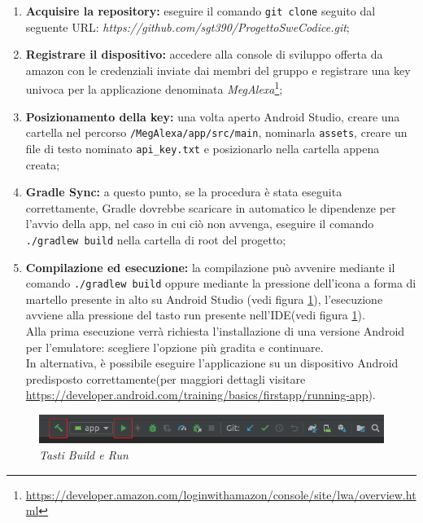 \begin{enumerate}
	\item \textbf{Acquisire la repository:} eseguire il comando \texttt{git clone} seguito dal seguente URL: \textit{https://github.com/sgt390/ProgettoSweCodice.git};
	\item \textbf{Registrare il dispositivo:} accedere alla console di sviluppo offerta da amazon con le credenziali inviate dai membri del gruppo e registrare una key univoca per la applicazione denominata \textit{MegAlexa}\footnote{\url{https://developer.amazon.com/loginwithamazon/console/site/lwa/overview.html}};
	\item \textbf{Posizionamento della key:} una volta aperto Android Studio, creare una cartella nel percorso \texttt{/MegAlexa/app/src/main}, nominarla \texttt{assets}, creare un file di testo nominato \texttt{api\_key.txt} e posizionarlo nella cartella appena creata;
	\item \textbf{Gradle Sync:} a questo punto, se la procedura è stata eseguita correttamente, Gradle dovrebbe scaricare in automatico le dipendenze per l'avvio della app, nel caso in cui ciò non avvenga, eseguire il comando \texttt{./gradlew build} nella cartella di root del progetto;
	\item\textbf{Compilazione ed esecuzione:} la compilazione può avvenire mediante il comando \texttt{./gradlew build} oppure mediante la pressione dell'icona a forma di martello presente in alto su Android Studio (vedi figura \ref{martello}), l'esecuzione avviene alla pressione del tasto run presente nell'IDE(vedi figura \ref{martello}).\\
	Alla prima esecuzione verrà richiesta l'installazione di una versione Android per l'emulatore: scegliere l'opzione più gradita e continuare.\\
	In alternativa, è possibile eseguire l'applicazione su un dispositivo Android predisposto correttamente(per maggiori dettagli visitare \url{https://developer.android.com/training/basics/firstapp/running-app}). 

	
\end{enumerate}

\begin{figure} [H]
	\centering
	\includegraphics[scale=0.9]{./images/AndroidStudio.PNG}
	\caption{\textit{Tasti Build e Run}}\label{martello}
\end{figure}

